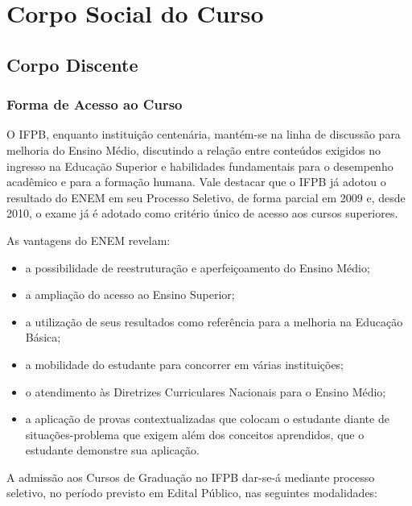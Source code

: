 \newpage
\section{Corpo Social do Curso}

\subsection{Corpo Discente}

\subsubsection{Forma de Acesso ao Curso}

	O IFPB, enquanto instituição centenária, mantém-se na linha de discussão para melhoria do Ensino Médio, discutindo a relação entre conteúdos exigidos no ingresso na Educação Superior e habilidades fundamentais para o desempenho acadêmico e para a formação humana. Vale destacar que o IFPB já adotou o resultado do ENEM em seu Processo Seletivo, de forma parcial em 2009 e, desde 2010, o exame já é adotado como critério único de acesso aos cursos superiores.

As vantagens do ENEM revelam:

\begin{itemize}
\item a possibilidade de reestruturação e aperfeiçoamento do Ensino Médio;
\item a ampliação do acesso ao Ensino Superior;
\item a utilização de seus resultados como referência para a melhoria na Educação Básica;
\item a mobilidade do estudante para concorrer em várias instituições;
\item o atendimento às Diretrizes Curriculares Nacionais para o Ensino Médio;
\item a aplicação de provas contextualizadas que colocam o estudante diante de situações-problema que exigem além dos conceitos aprendidos, que o estudante demonstre sua aplicação.
\end{itemize}

	A admissão aos Cursos de Graduação no IFPB dar-se-á mediante processo seletivo, no período previsto em Edital Público, nas seguintes modalidades:

